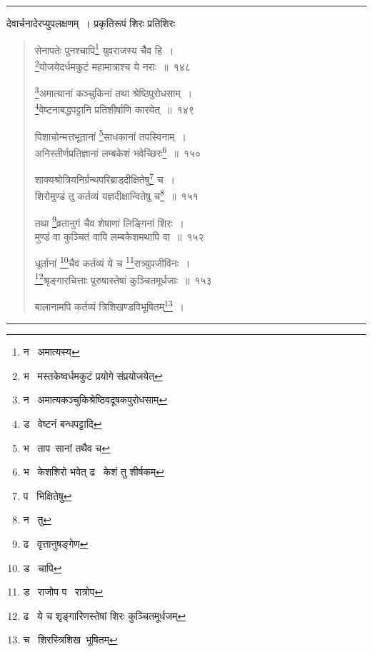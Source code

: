 \documentclass[11pt, openany]{book}
\begin{document}
\hrule

\vspace{2mm}
\noindent
देवार्चनादेरप्युपलक्षणम्~। प्रकृतिरूपं शिरः प्रतिशिरः 

\newpage

\begin{quote}
{\na सेनापतेः पुनश्चापि\renewcommand{\thefootnote}{1}\footnote{न \textendash\ अमात्यस्य} युवराजस्य चैैव हि~।\\
\renewcommand{\thefootnote}{2}\footnote{भ \textendash\ मस्तकेष्वर्धमकुटं प्रयोगे संप्रयोजयेत्}योजयेदर्धमकुटं महामात्राश्च ये नराः~॥~१४८

\renewcommand{\thefootnote}{3}\footnote{न \textendash\ अमात्यकञ्चुकिश्रेष्ठिवदूषकपुरोधसाम्}अमात्यानां कञ्चुकिनां तथा श्रेष्ठिपुरोधसाम्~।\\
\renewcommand{\thefootnote}{4}\footnote{ड \textendash\ वेष्टनं बन्धपट्टादि}वेष्टनाबद्धपट्टानि प्रतिशीर्षाणि कारयेत्~॥~१४९

पिशाचोन्मत्तभूतानां \renewcommand{\thefootnote}{5}\footnote{भ \textendash\ ताप\textendash\ सानां तथैव च}साधकानां तपस्विनाम्~।\\
अनिस्तीर्णप्रतिज्ञानां लम्बकेशं भवेच्छिरः\renewcommand{\thefootnote}{6}\footnote{भ \textendash\ केशशिरो भवेत् ढ \textendash\ केशं तु शीर्षकम्}~॥~१५०

शाक्यश्रोत्रियनिर्ग्रन्थपरिब्राड्दीक्षितेषु\renewcommand{\thefootnote}{7}\footnote{प \textendash\ भिक्षितेषु} च~।\\
शिरोमुण्डं तु कर्तव्यं यज्ञदीक्षान्वितेषु च\renewcommand{\thefootnote}{8}\footnote{न \textendash\ तु}~॥~१५१

तथा \renewcommand{\thefootnote}{9}\footnote{ढ \textendash\ वृत्तानुषङ्गेण}व्रतानुगं चैव शेषाणां लिङ्गिनां शिरः~।\\
मुण्डं वा कुञ्चितं वापि लम्बकेशमथापि वा~॥~१५२

धूर्तानां \renewcommand{\thefootnote}{10}\footnote{ड \textendash\ चापि}चैव कर्तव्यं ये च \renewcommand{\thefootnote}{11}\footnote{ड \textendash\ राजोप प \textendash\ रात्रोप}रात्र्युपजीविनः~।\\
\renewcommand{\thefootnote}{12}\footnote{ढ \textendash\ ये च शृङ्गारिणस्तेषां शिरः कुञ्चितमूर्धजम्}श्रृङ्गारचित्ताः पुरुषास्तेषां कुञ्चितमूर्धजाः~॥~१५३

बालानामपि कर्तव्यं त्रिशिखण्डविभूषितम्\renewcommand{\thefootnote}{13}\footnote{च \textendash\ शिरस्त्रिशिख\textendash\ भूषितम्}~।}
\end{quote}

\hrule
\end{document}
